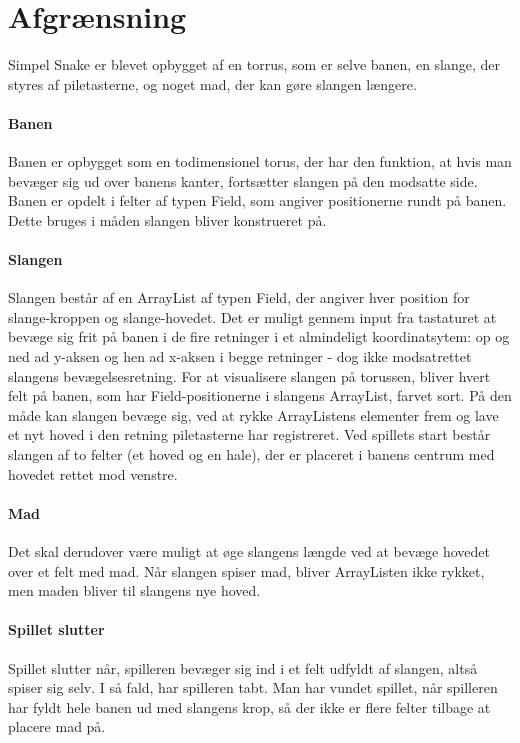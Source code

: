 \section{Afgrænsning}
Simpel Snake er blevet opbygget af en torrus, som er selve banen, en slange, der styres af piletasterne, og noget mad, der kan gøre slangen længere.

\paragraph{Banen}
Banen er opbygget som en todimensionel torus, der har den funktion, at hvis man bevæger sig ud over banens kanter, fortsætter slangen på den modsatte side.
Banen er opdelt i felter af typen Field, som angiver positionerne rundt på banen. Dette bruges i måden slangen bliver konstrueret på.

\paragraph{Slangen}
Slangen består af en ArrayList af typen Field, der angiver hver position for slange-kroppen og slange-hovedet. Det er muligt gennem input fra tastaturet at bevæge sig frit på banen i de fire retninger i et almindeligt koordinatsytem: op og ned ad y-aksen og hen ad x-aksen i begge retninger - dog ikke modsatrettet slangens bevægelsesretning. For at visualisere slangen på torussen, bliver hvert felt på banen, som har Field-positionerne i slangens ArrayList, farvet sort. På den måde kan slangen bevæge sig, ved at rykke ArrayListens elementer frem og lave et nyt hoved i den retning piletasterne har registreret.
Ved spillets start består slangen af to felter (et hoved og en hale), der er placeret i banens centrum med hovedet rettet mod venstre. 

\paragraph{Mad}
Det skal derudover være muligt at øge slangens længde ved at bevæge hovedet over et felt med mad. Når slangen spiser mad, bliver ArrayListen ikke rykket, men maden bliver til slangens nye hoved. 

\paragraph{Spillet slutter}
Spillet slutter når, spilleren bevæger sig ind i et felt udfyldt af slangen, altså spiser sig selv. I så fald, har spilleren tabt. Man har vundet spillet, når spilleren har fyldt hele banen ud med slangens krop, så der ikke er flere felter tilbage at placere mad på. 